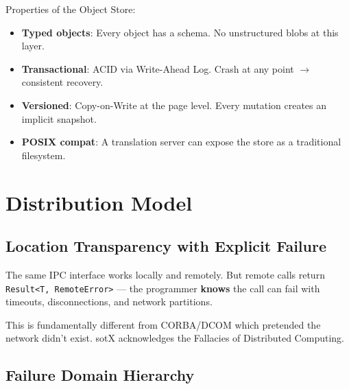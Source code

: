 \documentclass[11pt,a4paper]{article}
\begin{document}
Properties of the Object Store:
\begin{itemize}[leftmargin=2em]
  \item \textbf{Typed objects}: Every object has a schema. No unstructured blobs at this layer.
  \item \textbf{Transactional}: ACID via Write-Ahead Log. Crash at any point $\rightarrow$ consistent recovery.
  \item \textbf{Versioned}: Copy-on-Write at the page level. Every mutation creates an implicit snapshot.
  \item \textbf{POSIX compat}: A translation server can expose the store as a traditional filesystem.
\end{itemize}

\section{Distribution Model}

\subsection{Location Transparency with Explicit Failure}

The same IPC interface works locally and remotely. But remote calls return
\texttt{Result<T, RemoteError>} --- the programmer \textbf{knows} the call can fail
with timeouts, disconnections, and network partitions.

This is fundamentally different from CORBA/DCOM which pretended the network
didn't exist. sotX acknowledges the Fallacies of Distributed Computing.

\subsection{Failure Domain Hierarchy}
\end{document}

